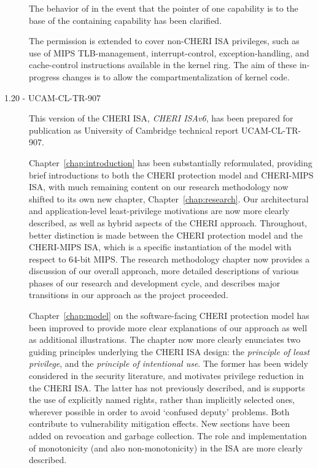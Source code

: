 \begin{description}
  The behavior of  in the event that the pointer of one
  capability is to the base of the containing capability has been clarified.

  The \cappermASR permission is extended to cover non-CHERI ISA
  privileges, such as use of MIPS TLB-management, interrupt-control,
  exception-handling, and cache-control instructions available in the kernel
  ring.
  The aim of these in-progress changes is to allow the compartmentalization of
  kernel code.

\item[1.20 - UCAM-CL-TR-907] This version of the CHERI ISA, \textit{CHERI
  ISAv6}, has been prepared for publication as University of Cambridge
  technical report UCAM-CL-TR-907.

  Chapter~\ref{chap:introduction} has been substantially reformulated,
  providing brief introductions to both the CHERI protection model and
  CHERI-MIPS ISA, with much remaining content on our research methodology now
  shifted to its own new chapter, Chapter~\ref{chap:research}.
  Our architectural and application-level least-privilege motivations are now
  more clearly described, as well as hybrid aspects of the CHERI approach.
  Throughout, better distinction is made between the CHERI protection model and
  the CHERI-MIPS ISA, which is a specific instantiation of the model with
  respect to 64-bit MIPS.
  The research methodology chapter now provides a discussion of our overall
  approach, more detailed descriptions of various phases of our research and
  development cycle, and describes major transitions in our approach as the
  project proceeded.

  Chapter~\ref{chap:model} on the software-facing CHERI protection model has
  been improved to provide more clear explanations of our approach as well as
  additional illustrations.
  The chapter now more clearly enunciates two guiding principles
  underlying the CHERI ISA design: the \textit{principle of least privilege},
  and the \textit{principle of intentional use}.
  The former has been widely considered in the security literature, and
  motivates privilege reduction in the CHERI ISA.
  The latter has not previously described, and is supports the use of explicitly
  named rights, rather than implicitly selected ones, wherever possible in order
  to avoid `confused deputy' problems.
  Both contribute to vulnerability mitigation effects.
  New sections have been added on revocation and garbage collection.
  The role and implementation of monotonicity (and also non-monotonicity) in
  the ISA are more clearly described.


\end{description}
